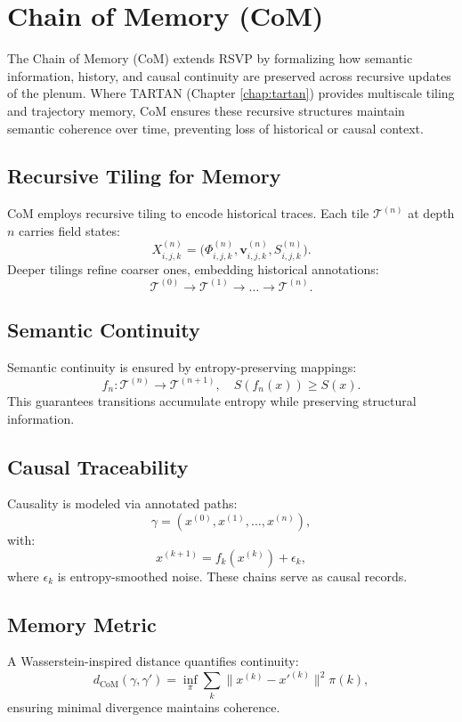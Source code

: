 \documentclass[12pt]{report}
\begin{document}
\chapter{Chain of Memory (CoM)}
\label{app:W}
The Chain of Memory (CoM) extends RSVP by formalizing how semantic information, history, and causal continuity are preserved across recursive updates of the plenum. Where TARTAN (Chapter \ref{chap:tartan}) provides multiscale tiling and trajectory memory, CoM ensures these recursive structures maintain semantic coherence over time, preventing loss of historical or causal context.

\section{Recursive Tiling for Memory}
CoM employs recursive tiling to encode historical traces. Each tile \(\mathcal{T}^{(n)}\) at depth \(n\) carries field states:
\[
X^{(n)}_{i,j,k} = \big(\Phi^{(n)}_{i,j,k}, \mathbf{v}^{(n)}_{i,j,k}, S^{(n)}_{i,j,k}\big).
\]
Deeper tilings refine coarser ones, embedding historical annotations:
\[
\mathcal{T}^{(0)} \to \mathcal{T}^{(1)} \to \dots \to \mathcal{T}^{(n)}.
\]

\section{Semantic Continuity}
Semantic continuity is ensured by entropy-preserving mappings:
\[
f_n : \mathcal{T}^{(n)} \to \mathcal{T}^{(n+1)}, \quad S(f_n(x)) \geq S(x).
\]
This guarantees transitions accumulate entropy while preserving structural information.

\section{Causal Traceability}
Causality is modeled via annotated paths:
\[
\gamma = (x^{(0)}, x^{(1)}, \dots, x^{(n)}),
\]
with:
\[
x^{(k+1)} = f_k(x^{(k)}) + \epsilon_k,
\]
where \(\epsilon_k\) is entropy-smoothed noise. These chains serve as causal records.

\section{Memory Metric}
A Wasserstein-inspired distance quantifies continuity:
\begin{equation}
d_{\text{CoM}}(\gamma, \gamma') = \inf_{\pi} \sum_{k} \|x^{(k)} - x'^{(k)}\|^2 \pi(k),
\end{equation}
ensuring minimal divergence maintains coherence.
\end{document}
